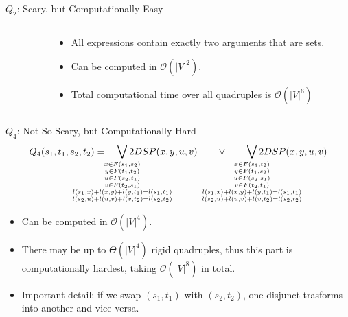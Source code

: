 \documentclass{beamer}
\newcommand{\OO}{\mathcal{O}}
\begin{document}
\begin{frame}{$Q_2$: Scary, but Computationally Easy}
\begin{columns}
\begin{column}{0.65\textwidth}
\begin{align}
\end{align}
\end{column}
\begin{column}{0.3\textwidth}
\begin{itemize}
    \item All expressions contain exactly two arguments that are sets.
    \item Can be computed in $\OO(|V|^2)$.
    \item Total computational time over all quadruples is $\OO(|V|^6)$
\end{itemize}
\end{column}
\end{columns}
\end{frame}

\begin{frame}{$Q_4$: Not So Scary, but Computationally Hard}
\small
\begin{multline}
    Q_4(s_1, t_1, s_2, t_2) = \quad
        \smashoperator{\bigvee_{
        \small \substack{
            x \in F(s_1, s_2)\\ 
            y \in F(t_1, t_2)\\ 
            u \in F(s_2, t_1)\\ 
            v \in F(t_2, s_1)\\ 
            l(s_1, x) + l(x, y) + l(y, t_1) = l(s_1, t_1)\\ 
            l(s_2, u) + l(u, v) + l(v, t_2) = l(s_2, t_2)
        }
        }} 2DSP(x, y, u, v)
        \quad\quad\vee\quad\quad
        \smashoperator{\bigvee_{
        \small \substack{
            x \in F(s_1, t_2)\\ 
            y \in F(t_1, s_2)\\ 
            u \in F(s_2, s_1)\\ 
            v \in F(t_2, t_1)\\ 
            l(s_1, x) + l(x, y) + l(y, t_1) = l(s_1, t_1)\\ 
            l(s_2, u) + l(u, v) + l(v, t_2) = l(s_2, t_2)
        }
        }} 2DSP(x, y, u, v) \label{eq:Q4} 
\end{multline}
\begin{itemize}
    \item Can be computed in $\OO(|V|^4)$.
    \item There may be up to $\Theta(|V|^4)$ rigid quadruples, thus this part is computationally hardest, taking $\OO(|V|^8)$ in total.
    \item Important detail: if we swap $(s_1, t_1)$ with $(s_2, t_2)$, one disjunct trasforms into another and vice versa. 
\end{itemize}
\end{frame}
\end{document}
